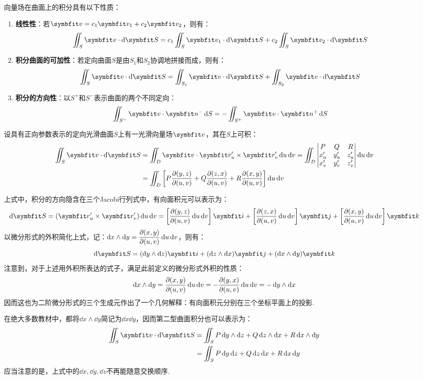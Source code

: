 向量场在曲面上的积分具有以下性质：
\begin{enumerate}[property]
    \item \textbf{线性性}：若$\vb{v} = c_1\vb{v}_1 + c_2\vb{v}_2$，则有：
    \[\iint_S\vb{v}\cdot\dd{\vb{S}} = c_1\iint_S\vb{v}_1\cdot\dd{\vb{S}} + c_2\iint_S\vb{v}_2\cdot\dd{\vb{S}}\]
    \item \textbf{积分曲面的可加性}：若定向曲面$S$是由$S_1$和$S_2$协调地拼接而成，则有：
    \[\iint_S\vb{v}\cdot\dd{\vb{S}} = \iint_{S_1}\vb{v}\cdot\dd{\vb{S}} + \iint_{S_2}\vb{v}\cdot\dd{\vb{S}}\]
    \item \textbf{积分的方向性}：以$S^+$和$S^-$表示曲面的两个不同定向：
    \[\iint_{S^-}\vb{v}\cdot\vb{n^-}\dd{S} = -\iint_{S^+}\vb{v}\cdot\vb{n^+}\dd{S}\]
\end{enumerate}

\begin{theorem}
    设具有正向参数表示的定向光滑曲面$S$上有一光滑向量场$\vb{v}$，其在$S$上可积：
    \begin{align*}
        \iint_S\vb{v}\cdot\dd{\vb{S}} &= \iint_D\vb{v}\cdot\vb{r}'_u\times\vb{r}'_v\dd{u}\dd{v} = \iint_D\begin{vmatrix}
            P & Q & R \\ x'_u & y'_u & z'_u \\ x'_v & y'_v & z'_v
        \end{vmatrix}\dd{u}\dd{v} \\
        &= \iint_D\left[P\pdv{(y,z)}{(u,v)} + Q\pdv{(z,x)}{(u,v)} + R\pdv{(x,y)}{(u,v)}\right]\dd{u}\dd{v}
    \end{align*}
\end{theorem}

上式中，积分的方向隐含在三个Jacobi行列式中，有向面积元可以表示为：
\[\dd{\vb{S}} = (\vb{r}'_u\times\vb{r}'_v)\dd{u}\dd{v} = \left[\pdv{(y,z)}{(u,v)}\dd{u}\dd{v}\right]\vb{i} + \left[\pdv{(z,x)}{(u,v)}\dd{u}\dd{v}\right]\vb{j} + \left[\pdv{(x,y)}{(u,v)}\dd{u}\dd{v}\right]\vb{k}\]
以微分形式的外积简化上式，记：$\displaystyle\dd{x}\wedge\dd{y} = \pdv{(x,y)}{(u,v)}\dd{u}\dd{v}$，则有：
\[\dd{\vb{S}} = (\dd{y}\wedge\dd{z})\vb{i} + (\dd{z}\wedge\dd{x})\vb{j} + (\dd{x}\wedge\dd{y})\vb{k}\]
注意到，对于上述用外积所表达的式子，满足此前定义的微分形式外积的性质：
\[\dd{x}\wedge\dd{y} = \pdv{(x,y)}{(u,v)}\dd{u}\dd{v} = -\pdv{(y,x)}{(u,v)}\dd{u}\dd{v} = -\dd{y}\wedge\dd{x}\]
因而这也为二阶微分形式的三个生成元作出了一个几何解释：有向面积元分别在三个坐标平面上的投影.


在绝大多数教材中，都将$\dd{x}\wedge\dd{y}$简记为$\dd{x}\dd{y}$，因而第二型曲面积分也可以表示为：
\begin{align*}
    \iint_S\vb{v}\cdot\dd{\vb{S}} &= \iint_S P\dd{y}\wedge\dd{z} + Q\dd{z}\wedge\dd{x} + R\dd{x}\wedge\dd{y}\\
    &= \iint_S P\dd{y}\dd{z} + Q\dd{z}\dd{x} + R\dd{x}\dd{y}
\end{align*}
应当注意的是，上式中的$\dd{x},\dd{y},\dd{z}$不再能随意交换顺序.

